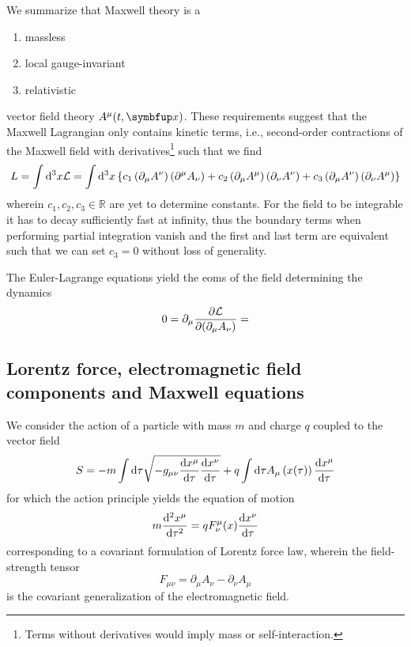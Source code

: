 We summarize that Maxwell theory is a
\begin{enumerate}
	\item massless
	\item local gauge-invariant
	\item relativistic	
\end{enumerate}
vector field theory $A^\mu(t,\vb{x})$.
These requirements suggest that the Maxwell Lagrangian only contains kinetic terms, i.e., second-order contractions of the Maxwell field with derivatives\footnote{Terms without derivatives would imply mass or self-interaction.}
such that we find
\begin{equation}
	L
	=
	\int\odif[order={3}]{x}
	\mathcal{L}
	=
	\int\odif[order={3}]{x}
	\left\{
		c_1
		\left(
			\partial_\mu
			A^\nu
		\right)
		\left(
			\partial^\mu
			A_\nu
		\right)
		+
		c_2
		\left(
			\partial_\mu
			A^\mu
		\right)
		\left(
			\partial_\nu
			A^\nu
		\right)
		+
		c_3
		\left(
			\partial_\mu
			A^\nu
		\right)
		\left(
			\partial_\nu
			A^\mu
		\right)
	\right\}
\end{equation}
wherein $c_1,c_2,c_3\in\mathbb{R}$ are yet to determine constants.
For the field to be integrable it has to decay sufficiently fast at infinity, thus the boundary terms when performing partial integration vanish and the first and last term are equivalent~\cite{deRham2014} such that we can set $c_3=0$ without loss of generality.

The Euler-Lagrange equations yield the \gls{eom}s of the field determining the dynamics
\begin{equation}
	0
	=
	\partial_\mu\pdv{\mathcal{L}}{(\partial_\mu A_\nu)}
	=
\end{equation}

\subsection{Lorentz force, electromagnetic field components and Maxwell equations}

We consider the action of a particle with mass $m$ and charge $q$ coupled to the vector field~\cite[p.~244]{Zee2013}
\begin{equation}
	S
	=
	-
	m\int\odif{\tau}
	\sqrt{-g_{\mu\nu}\odv{x^\mu}{\tau}\odv{x^\nu}{\tau}}
	+
	q\int\odif{\tau}
	A_\mu\left(x(\tau)\right)
	\odv{x^\mu}{\tau}
\end{equation}
for which the action principle yields the equation of motion
\begin{equation}
	m
	\odv[order={2}]{x^\mu}{\tau}
	=
	qF^\mu_\nu(x)\odv{x^\nu}{\tau}
	\label{eq:cov_lorentz_force}
\end{equation}
corresponding to a covariant formulation of Lorentz force law, wherein the field-strength tensor
\begin{equation}
	F_{\mu\nu}
	=
	\partial_\mu
	A_\nu
	-
	\partial_\nu
	A_\mu
\end{equation}
is the covariant generalization of the electromagnetic field.

